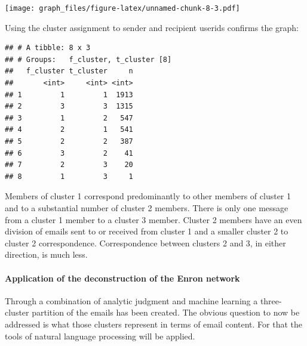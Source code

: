 \documentclass[]{article}
\newenvironment{Shaded}{\begin{snugshade}}{\end{snugshade}}
\newcommand{\KeywordTok}[1]{\textcolor[rgb]{0.13,0.29,0.53}{\textbf{#1}}}
\newcommand{\NormalTok}[1]{#1}
\newcommand{\OperatorTok}[1]{\textcolor[rgb]{0.81,0.36,0.00}{\textbf{#1}}}
\newcommand{\StringTok}[1]{\textcolor[rgb]{0.31,0.60,0.02}{#1}}
\let\oldparagraph\paragraph
\renewcommand{\paragraph}[1]{\oldparagraph{#1}\mbox{}}
\begin{document}
\texttt{[image: graph\_files/figure-latex/unnamed-chunk-8-3.pdf]}

Using the cluster assignment to sender and recipient userids confirms
the graph:

\begin{Shaded}
\end{Shaded}

\begin{verbatim}
## # A tibble: 8 x 3
## # Groups:   f_cluster, t_cluster [8]
##   f_cluster t_cluster     n
##       <int>     <int> <int>
## 1         1         1  1913
## 2         3         3  1315
## 3         1         2   547
## 4         2         1   541
## 5         2         2   387
## 6         3         2    41
## 7         2         3    20
## 8         1         3     1
\end{verbatim}

Members of cluster 1 correspond predominantly to other members of
cluster 1 and to a substantial number of cluster 2 members. There is
only one message from a cluster 1 member to a cluster 3 member. Cluster
2 members have an even division of emails sent to or received from
cluster 1 and a smaller cluster 2 to cluster 2 correspondence.
Correspondence between clusters 2 and 3, in either direction, is much
less.

\hypertarget{application-of-the-deconstruction-of-the-enron-network}{%
\paragraph{Application of the deconstruction of the Enron
network}\label{application-of-the-deconstruction-of-the-enron-network}}

Through a combination of analytic judgment and machine learning a
three-cluster partition of the emails has been created. The obvious
question to now be addressed is what those clusters represent in terms
of email content. For that the tools of natural language processing will
be applied.
\end{document}
